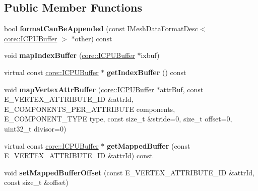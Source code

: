 \subsection*{Public Member Functions}
\begin{DoxyCompactItemize}
\item 
bool {\bfseries format\+Can\+Be\+Appended} (const \hyperlink{classirr_1_1scene_1_1IMeshDataFormatDesc}{I\+Mesh\+Data\+Format\+Desc}$<$ \hyperlink{classirr_1_1core_1_1ICPUBuffer}{core\+::\+I\+C\+P\+U\+Buffer} $>$ $\ast$other) const \hypertarget{classirr_1_1scene_1_1ICPUMeshDataFormatDesc_a19ab69d08fe00b1bac3282900e1a46b5}{}\label{classirr_1_1scene_1_1ICPUMeshDataFormatDesc_a19ab69d08fe00b1bac3282900e1a46b5}

\item 
void {\bfseries map\+Index\+Buffer} (\hyperlink{classirr_1_1core_1_1ICPUBuffer}{core\+::\+I\+C\+P\+U\+Buffer} $\ast$ixbuf)\hypertarget{classirr_1_1scene_1_1ICPUMeshDataFormatDesc_ab1591e86c8073c37bc494f29a266f597}{}\label{classirr_1_1scene_1_1ICPUMeshDataFormatDesc_ab1591e86c8073c37bc494f29a266f597}

\item 
virtual const \hyperlink{classirr_1_1core_1_1ICPUBuffer}{core\+::\+I\+C\+P\+U\+Buffer} $\ast$ {\bfseries get\+Index\+Buffer} () const \hypertarget{classirr_1_1scene_1_1ICPUMeshDataFormatDesc_a3e1d0cb1d3224d341674c39bb0b32e3c}{}\label{classirr_1_1scene_1_1ICPUMeshDataFormatDesc_a3e1d0cb1d3224d341674c39bb0b32e3c}

\item 
void {\bfseries map\+Vertex\+Attr\+Buffer} (\hyperlink{classirr_1_1core_1_1ICPUBuffer}{core\+::\+I\+C\+P\+U\+Buffer} $\ast$attr\+Buf, const E\+\_\+\+V\+E\+R\+T\+E\+X\+\_\+\+A\+T\+T\+R\+I\+B\+U\+T\+E\+\_\+\+ID \&attr\+Id, E\+\_\+\+C\+O\+M\+P\+O\+N\+E\+N\+T\+S\+\_\+\+P\+E\+R\+\_\+\+A\+T\+T\+R\+I\+B\+U\+TE components, E\+\_\+\+C\+O\+M\+P\+O\+N\+E\+N\+T\+\_\+\+T\+Y\+PE type, const size\+\_\+t \&stride=0, size\+\_\+t offset=0, uint32\+\_\+t divisor=0)\hypertarget{classirr_1_1scene_1_1ICPUMeshDataFormatDesc_a39f0d0f14f6ed5f989a70ed0ddc96352}{}\label{classirr_1_1scene_1_1ICPUMeshDataFormatDesc_a39f0d0f14f6ed5f989a70ed0ddc96352}

\item 
virtual const \hyperlink{classirr_1_1core_1_1ICPUBuffer}{core\+::\+I\+C\+P\+U\+Buffer} $\ast$ {\bfseries get\+Mapped\+Buffer} (const E\+\_\+\+V\+E\+R\+T\+E\+X\+\_\+\+A\+T\+T\+R\+I\+B\+U\+T\+E\+\_\+\+ID \&attr\+Id) const \hypertarget{classirr_1_1scene_1_1ICPUMeshDataFormatDesc_aa6f266e7db72021074c60ba47638bd1d}{}\label{classirr_1_1scene_1_1ICPUMeshDataFormatDesc_aa6f266e7db72021074c60ba47638bd1d}

\item 
void {\bfseries set\+Mapped\+Buffer\+Offset} (const E\+\_\+\+V\+E\+R\+T\+E\+X\+\_\+\+A\+T\+T\+R\+I\+B\+U\+T\+E\+\_\+\+ID \&attr\+Id, const size\+\_\+t \&offset)\hypertarget{classirr_1_1scene_1_1ICPUMeshDataFormatDesc_ab0d72252abc276fcb275882bfec0d88b}{}\label{classirr_1_1scene_1_1ICPUMeshDataFormatDesc_ab0d72252abc276fcb275882bfec0d88b}

\end{DoxyCompactItemize}
